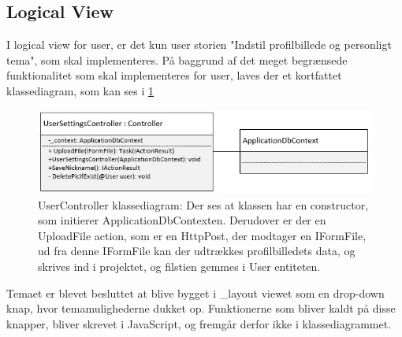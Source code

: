 \subsection{Logical View}

I logical view for user, er det kun user storien "Indstil profilbillede og personligt tema", som skal implementeres. På baggrund af det meget begrænsede funktionalitet som skal implementeres for user, laves der et kortfattet klassediagram, som kan ses i \ref{fig:UserController_Class}

\begin{figure}[H]
    \centering
    \includegraphics[width=0.9\linewidth]{09_Arkitektur/User/Images/US_Class.JPG}
    \caption{UserController klassediagram: Der ses at klassen har en constructor, som initierer ApplicationDbContexten. Derudover er der en UploadFile action, som er en HttpPost, der modtager en IFormFile, ud fra denne IFormFile kan der udtrækkes profilbilledets data, og skrives ind i projektet, og filstien gemmes i User entiteten.}
    \label{fig:UserController_Class}
\end{figure}

\noindent Temaet er blevet besluttet at blive bygget i \_layout viewet som en drop-down knap, hvor temamulighederne dukket op. Funktionerne som bliver kaldt på disse knapper, bliver skrevet i JavaScript, og fremgår derfor ikke i klassediagrammet.